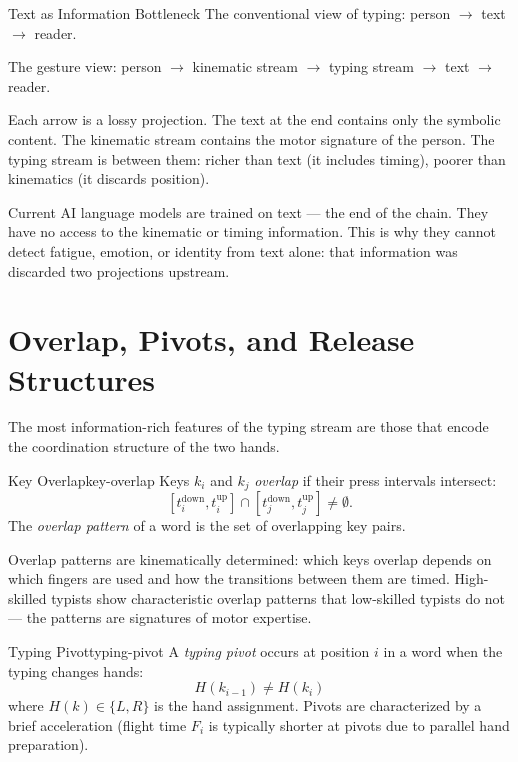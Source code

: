 \begin{conceptaside}{Text as Information Bottleneck}
  The conventional view of typing: person $\to$ text $\to$ reader.

  The gesture view: person $\to$ kinematic stream $\to$ typing stream
  $\to$ text $\to$ reader.

  Each arrow is a lossy projection. The text at the end contains
  only the symbolic content. The kinematic stream contains the
  motor signature of the person. The typing stream is between them:
  richer than text (it includes timing), poorer than kinematics
  (it discards position).

  Current AI language models are trained on text — the end of the
  chain. They have no access to the kinematic or timing information.
  This is why they cannot detect fatigue, emotion, or identity from
  text alone: that information was discarded two projections upstream.
\end{conceptaside}

\section{Overlap, Pivots, and Release Structures}

The most information-rich features of the typing stream are those
that encode the coordination structure of the two hands.

\begin{definition}{Key Overlap}{key-overlap}
  Keys $k_i$ and $k_j$ \emph{overlap} if their press intervals intersect:
  \[
    [t_i^\text{down}, t_i^\text{up}] \cap [t_j^\text{down}, t_j^\text{up}]
    \neq \emptyset.
  \]
  The \emph{overlap pattern} of a word is the set of overlapping key pairs.
\end{definition}

Overlap patterns are kinematically determined: which keys overlap depends
on which fingers are used and how the transitions between them are timed.
High-skilled typists show characteristic overlap patterns that low-skilled
typists do not — the patterns are signatures of motor expertise.

\begin{definition}{Typing Pivot}{typing-pivot}
  A \emph{typing pivot} occurs at position $i$ in a word when the
  typing changes hands:
  \[
    H(k_{i-1}) \neq H(k_i)
  \]
  where $H(k) \in \{L, R\}$ is the hand assignment.
  Pivots are characterized by a brief acceleration (flight time
  $F_i$ is typically shorter at pivots due to parallel hand preparation).
\end{definition}

